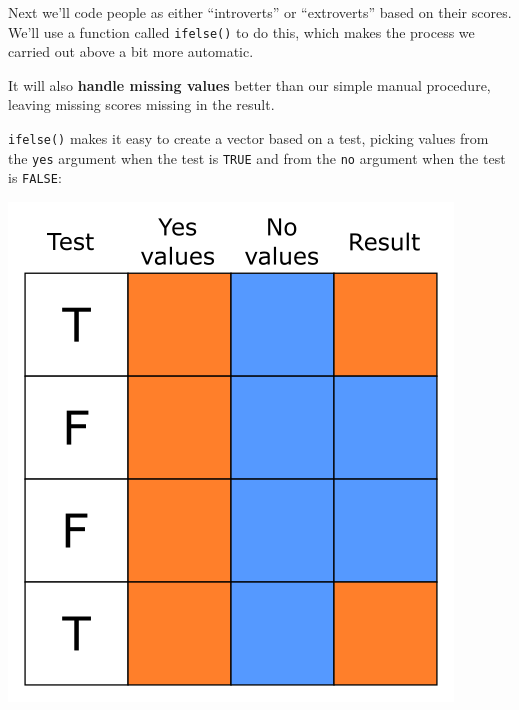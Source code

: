 \documentclass[
]{book}
\newenvironment{Shaded}{\begin{snugshade}}{\end{snugshade}}
\newcommand{\AttributeTok}[1]{\textcolor[rgb]{0.77,0.63,0.00}{#1}}
\newcommand{\CommentTok}[1]{\textcolor[rgb]{0.56,0.35,0.01}{\textit{#1}}}
\newcommand{\FunctionTok}[1]{\textcolor[rgb]{0.00,0.00,0.00}{#1}}
\newcommand{\NormalTok}[1]{#1}
\newcommand{\OtherTok}[1]{\textcolor[rgb]{0.56,0.35,0.01}{#1}}
\newcommand{\SpecialCharTok}[1]{\textcolor[rgb]{0.00,0.00,0.00}{#1}}
\newcommand{\StringTok}[1]{\textcolor[rgb]{0.31,0.60,0.02}{#1}}
\begin{document}
Next we'll code people as either ``introverts'' or ``extroverts'' based
on their scores. We'll use a function called \texttt{ifelse()} to do this,
which makes the process we carried out above a bit more automatic.

It will also \textbf{handle missing values} better than our simple
manual procedure, leaving missing scores missing in the result.

\begin{Shaded}
\end{Shaded}

\texttt{ifelse()} makes it easy to create
a vector based on a test, picking values from the \texttt{yes} argument
when the test is \texttt{TRUE} and from the \texttt{no} argument when the test
is \texttt{FALSE}:

\includegraphics{Images/IfElse.png}
\end{document}
